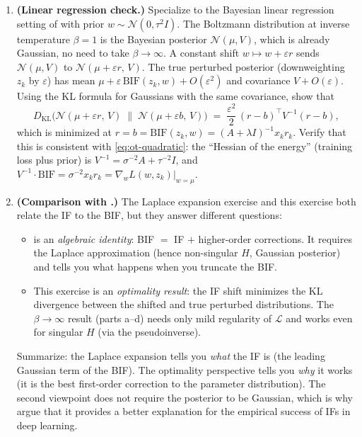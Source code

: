 \documentclass[11pt]{article}
\begin{document}
\begin{exercise}
\begin{enumerate}
  \item \textbf{(Linear regression check.)} Specialize to the Bayesian linear regression setting of  with prior $w\sim\mathcal{N}(0,\tau^2I)$. The Boltzmann distribution at inverse temperature $\beta = 1$ is the Bayesian posterior $\mathcal{N}(\mu,V)$, which is already Gaussian, no need to take $\beta\to\infty$. A constant shift $w\mapsto w + \varepsilon r$ sends $\mathcal{N}(\mu,V)$ to $\mathcal{N}(\mu + \varepsilon r,\,V)$. The true perturbed posterior (downweighting $z_k$ by $\varepsilon$) has mean $\mu + \varepsilon\,\mathrm{BIF}(z_k,w) + O(\varepsilon^2)$ and covariance $V + O(\varepsilon)$. Using the KL formula for Gaussians with the same covariance, show that
  \[
    D_{\mathrm{KL}}\bigl(\mathcal{N}(\mu + \varepsilon r,\,V)\;\big\|\;\mathcal{N}(\mu + \varepsilon b,\,V)\bigr) \;=\; \frac{\varepsilon^2}{2}\,(r-b)^\top V^{-1}(r-b),
  \]
  which is minimized at $r = b = \mathrm{BIF}(z_k,w) = (A + \lambda I)^{-1}x_k r_k$. Verify that this is consistent with \eqref{eq:ot-quadratic}: the ``Hessian of the energy'' (training loss plus prior) is $V^{-1} = \sigma^{-2}A + \tau^{-2}I$, and $V^{-1}\cdot\mathrm{BIF} = \sigma^{-2}x_k r_k = \nabla_w L(w,z_k)\big|_{w=\mu}$.

  \item \textbf{(Comparison with .)} The Laplace expansion exercise and this exercise both relate the IF to the BIF, but they answer different questions:
  \begin{itemize}
    \item {} is an \emph{algebraic identity}: BIF $=$ IF $+$ higher-order corrections. It requires the Laplace approximation (hence non-singular $H$, Gaussian posterior) and tells you what happens when you truncate the BIF.
    \item This exercise is an \emph{optimality result}: the IF shift minimizes the KL divergence between the shifted and true perturbed distributions. The $\beta\to\infty$ result (parts a--d) needs only mild regularity of $\mathcal{L}$ and works even for singular $H$ (via the pseudoinverse).
  \end{itemize}
  Summarize: the Laplace expansion tells you \emph{what} the IF is (the leading Gaussian term of the BIF). The optimality perspective tells you \emph{why} it works (it is the best first-order correction to the parameter distribution). The second viewpoint does not require the posterior to be Gaussian, which is why \citet{mlodozeniec2025distributional} argue that it provides a better explanation for the empirical success of IFs in deep learning.
\end{enumerate}
\end{exercise}
\end{document}

